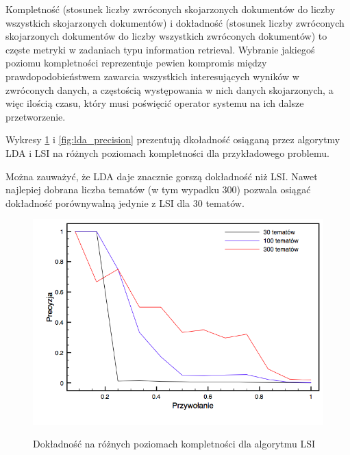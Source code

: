 \documentclass[11pt,a4paper]{article}
\begin{document}
Kompletność (stosunek liczby zwróconych skojarzonych dokumentów do liczby
wszystkich skojarzonych dokumentów) i dokładność (stosunek liczby zwróconych
skojarzonych dokumentów do liczby wszystkich zwróconych dokumentów) to częste
metryki w zadaniach typu information retrieval. Wybranie jakiegoś poziomu
kompletności reprezentuje pewien kompromis między prawdopodobieństwem zawarcia
wszystkich interesujących wyników w zwróconych danych, a częstością
występowania w nich danych skojarzonych, a więc ilością czasu, który musi
poświęcić operator systemu na ich dalsze przetworzenie.

Wykresy \ref{fig:lsi_precision} i \ref{fig:lda_precision} prezentują dkoładność
osiąganą przez algorytmy LDA i LSI na różnych poziomach kompletności dla
przykładowego problemu.

Można zauważyć, że LDA daje znacznie gorszą dokładność niż LSI. Nawet najlepiej
dobrana liczba tematów (w tym wypadku 300) pozwala osiągać dokładność
porównywalną jedynie z LSI dla 30 tematów.

\begin{figure}[h]
\caption{Dokładność na różnych poziomach kompletności dla algorytmu LSI}
\includegraphics[width=\linewidth]{gfx/lsi_precision.png}
\label{fig:lsi_precision}
\end{figure}
\end{document}
